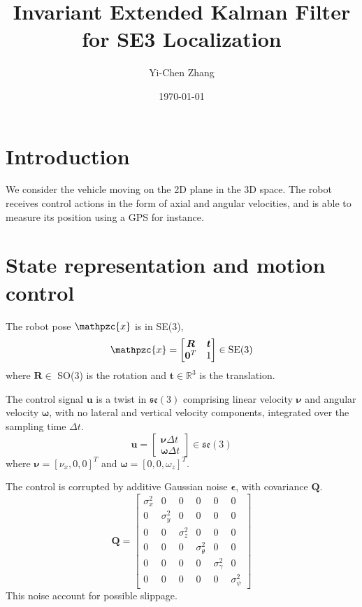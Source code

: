 \documentclass[12pt, a4paper]{article}
\title{Invariant Extended Kalman Filter for SE3 Localization}
\author{Yi-Chen Zhang}
\date{\today}
\begin{document}
\maketitle

\section{Introduction}
We consider the vehicle moving on the 2D plane in the 3D space. The robot
receives control actions in the form of axial and angular velocities, and is
able to measure its position using a GPS for instance.

\section{State representation and motion control}
The robot pose $\mathpzc{x}$ is in SE(3),
\[
  \mathpzc{x}=\begin{bmatrix}
    \bm{R} & \bm{t}\\
    \bm{0}^{T} & 1
  \end{bmatrix}\in \text{SE(3)}
\]
where $\bm{R}\in$ SO(3) is the rotation and $\bm{t}\in\mathbb{R}^{3}$ is the
translation.

The control signal $\bm{u}$ is a twist in $\mathfrak{se}(3)$ comprising
linear velocity $\bm{\nu}$ and angular velocity $\bm{\omega}$, with no
lateral and vertical velocity components, integrated over the sampling time
$\Delta t$.
\[
  \bm{u} = \begin{bmatrix}
    \bm{\nu}\Delta t\\
    \bm{\omega}\Delta t
  \end{bmatrix}\in\mathfrak{se}(3)
\]
where $\bm{\nu}=[\nu_{x}, 0, 0]^{T}$ and $\bm{\omega}=[0, 0, \omega_{z}]^{T}$.

The control is corrupted by additive Gaussian noise $\bm{\epsilon}$, with
covariance $\bm{Q}$.
\[
  \bm{Q}=\begin{bmatrix}
    \sigma_{x}^{2} & 0 & 0 & 0 & 0 & 0\\
    0 & \sigma_{y}^{2} & 0 & 0 & 0 & 0\\
    0 & 0 & \sigma_{z}^{2} & 0 & 0 & 0\\
    0 & 0 & 0 & \sigma_{\theta}^{2} & 0 & 0\\
    0 & 0 & 0 & 0 & \sigma_{\gamma}^{2} & 0\\
    0 & 0 & 0 & 0 & 0 & \sigma_{\psi}^{2}
  \end{bmatrix}
\]
This noise account for possible slippage.
\end{document}
